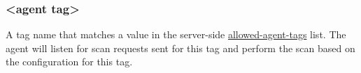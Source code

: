 \subsubsection{<agent tag>}\label{sec:agent-tag}
A tag name that matches a value in the server-side \hyperref[sec:yaml-resolver-allowed-agent-tags]{allowed-agent-tags}
list.  The agent will listen for scan requests sent for this tag and perform the \scaresolver scan
based on the configuration for this tag.
